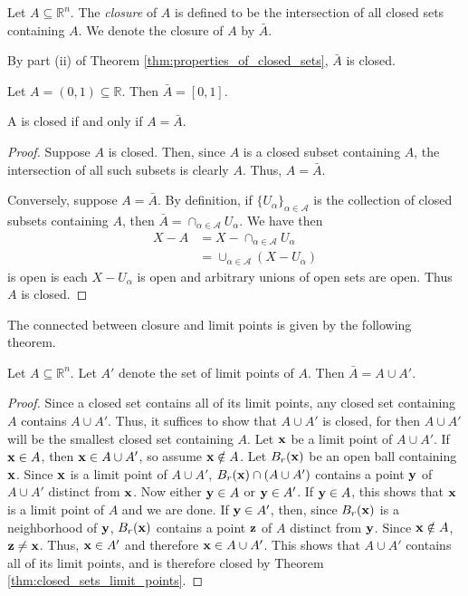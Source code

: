 \documentclass[12pt,letterpaper,reqno]{article}
\numberwithin{equation}{section}
\newcommand{\R}{\ensuremath{\mathbb R}}
\newcommand{\bx}{{\bf x}}
\newcommand{\by}{{\bf y}}
\newcommand{\bz}{{\bf z}}
\begin{document}
{\begin{defn}[Closure]
	Let $A \subseteq \R^n$. The \emph{closure} of $A$ is defined to be the intersection of all closed sets containing $A$. We denote the closure of $A$ by $\bar{A}$.
\end{defn}
By part (ii) of Theorem \ref{thm:properties_of_closed_sets}, $\bar{A}$ is closed. 

\begin{example}\label{ex:closure}
Let $A=(0,1) \subseteq \R$. Then $\bar{A}=[0,1]$.	
\end{example}


\begin{prop}
A is closed if and only if $A=\bar{A}$.	
\end{prop}

\begin{proof}
	Suppose $A$ is closed. Then, since $A$ is a closed subset containing $A$, the intersection of all such subsets is clearly $A$. Thus, $A=\bar{A}$.
	
	Conversely, suppose $A=\bar{A}$. By definition, if $\{U_\alpha\}_{\alpha \in \mathscr{A}}$ is the collection of closed subsets containing $A$, then $\bar{A}=\cap_{\alpha \in \mathscr{A}}U_\alpha$. We have then
	\begin{align*}
		X-A&=X-\cap_{\alpha \in \mathscr{A}}U_\alpha \\
		&=\cup_{\alpha \in \mathscr{A}}(X-U_\alpha)
 	\end{align*}
 	is open is each $X-U_\alpha$ is open and arbitrary unions of open sets are open. Thus $A$ is closed.
\end{proof}

The connected between closure and limit points is given by the following theorem.

\begin{thm}\label{thm:closed_set_limit_pts}
	Let $A \subseteq \R^n$. Let $A'$ denote the set of limit points of $A$. Then $\bar{A}=A \cup A'$.
\end{thm}

\begin{proof}
	Since a closed set contains all of its limit points, any closed set containing $A$ contains $A \cup A'$. Thus, it suffices to show that $A \cup A'$ is closed, for then $A \cup A'$ will be the smallest closed set containing $A$. Let $\bx$ be a limit point of $A \cup A'$. If $\bx \in A$, then $\bx \in A \cup A'$, so assume $\bx \notin A$. Let $B_r(\bx)$ be an open ball containing $\bx$. Since $\bx$ is a limit point of $A \cup A'$, $B_r(\bx) \cap (A \cup A')$ contains a point $\by$ of $A \cup A'$ distinct from $\bx$. Now either $\by \in A$ or $\by \in A'$. If $\by \in A$, this shows that $\bx$ is a limit point of $A$ and we are done. If $\by \in A'$, then, since $B_r(\bx)$ is a neighborhood of $\by$, $B_r(\bx)$ contains a point $\bz$ of $A$ distinct from $\by$. Since $\bx \notin A$, $\bz \neq \bx$. Thus, $\bx \in A'$ and therefore $\bx \in A \cup A'$. This shows that $A \cup A'$ contains all of its limit points, and is therefore closed by Theorem \ref{thm:closed_sets_limit_points}.
\end{proof}

}
\end{document}
